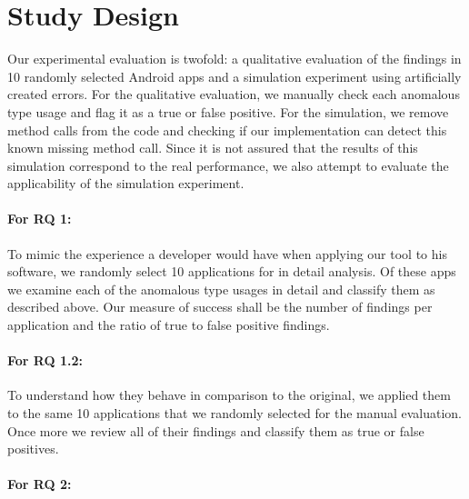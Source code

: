 
\section{Study Design}

Our experimental evaluation is twofold: a qualitative evaluation of the findings in 10 randomly selected Android apps and a simulation experiment using artificially created errors.
For the qualitative evaluation, we manually check each anomalous type usage and flag it as a true or false positive.
For the simulation, we remove method calls from the code and checking if our implementation can detect this known missing method call.
Since it is not assured that the results of this simulation correspond to the real performance, we also attempt to evaluate the applicability of the simulation experiment.


\paragraph{For RQ 1:}

To mimic the experience a developer would have when applying our tool to his software, we randomly select 10 applications for in detail analysis.
Of these apps we examine each of the anomalous type usages in detail and classify them as described above.
Our measure of success shall be the number of findings per application and the ratio of true to false positive findings.

\paragraph{For RQ 1.2:}
To understand how they behave in comparison to the original, we applied them to the same 10 applications that we randomly selected for the manual evaluation.
Once more we review all of their findings and classify them as true or false positives.

\paragraph{For RQ 2:}

